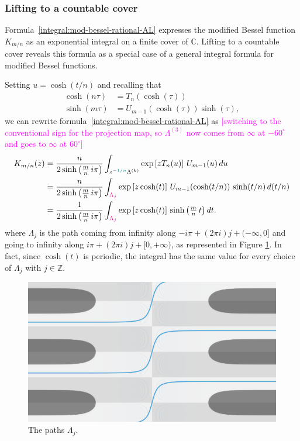 \documentclass{article}
\newcommand{\Z}{\mathbb{Z}}
\newcommand{\C}{\mathbb{C}}
\theoremstyle{definition}
\theoremstyle{plain}
\begin{document}
{\subsubsection{Lifting to a countable cover}\label{countable-cover}
Formula~\eqref{integral:mod-bessel-rational-AL} expresses the modified Bessel function $K_{m/n}$ as an exponential integral on a finite cover of $\C$. Lifting to a countable cover reveals this formula as a special case of a general integral formula for modified Bessel functions.

Setting $u = \cosh(t/n)$ and recalling that
\begin{align*}
\cosh(n\tau) & = T_n(\cosh(\tau)) \\
\sinh(m\tau) & = U_{m-1}(\cosh(\tau)) \sinh(\tau),
\end{align*}
we can rewrite formula~\eqref{integral:mod-bessel-rational-AL} as \textcolor{magenta}{[switching to the conventional sign for the projection map, so $\Lambda^{(3)}$ now comes from $\infty$ at $-60^\circ$ and goes to $\infty$ at $60^\circ$]}
\begin{align}
\notag K_{m/n}(z) & = \frac{n}{2 \sinh\big(\tfrac{m}{n}\,i\pi\big)} \int_{z^{-\textcolor{DarkCyan}{1/n}}\Lambda^{(k)}} \exp\left[z T_n(u)\right]\,U_{m-1}(u)\,du \\
\notag & = \frac{n}{2 \sinh\big(\tfrac{m}{n}\,i\pi\big)} \int_{\textcolor{magenta}{\Lambda_j}} \exp\left[z \cosh(t)\right]\,U_{m-1}(\cosh(t/n))\,\sinh(t/n)\,d(t/n) \\
\label{integral:mod-bessel-lifted} & = \frac{1}{2 \sinh\big(\tfrac{m}{n}\,i\pi\big)} \int_{\textcolor{magenta}{\Lambda_j}} \exp\left[z \cosh(t)\right]\,\sinh\big(\tfrac{m}{n}\,t\big)\,dt.
\end{align}
where $\Lambda_j$ is the path coming from infinity along $-i\pi+(2\pi i) j+(-\infty,0]$ and going to infinity along $i \pi+(2\pi i) j+[0,+\infty)$, as represented in Figure \ref{fig:bessel_unrolled}. In fact, since $\cosh(t)$ is periodic, the integral has the same value for every choice of $\Lambda_j$ with $j\in\Z$.  
\begin{figure}[ht]
    \centering
    \includegraphics[scale=0.3]{figures/Bessel0_unrolled_lightblue.png}
    \caption{The paths $\Lambda_j$.}
    \label{fig:bessel_unrolled}
\end{figure}

}
\end{document}
